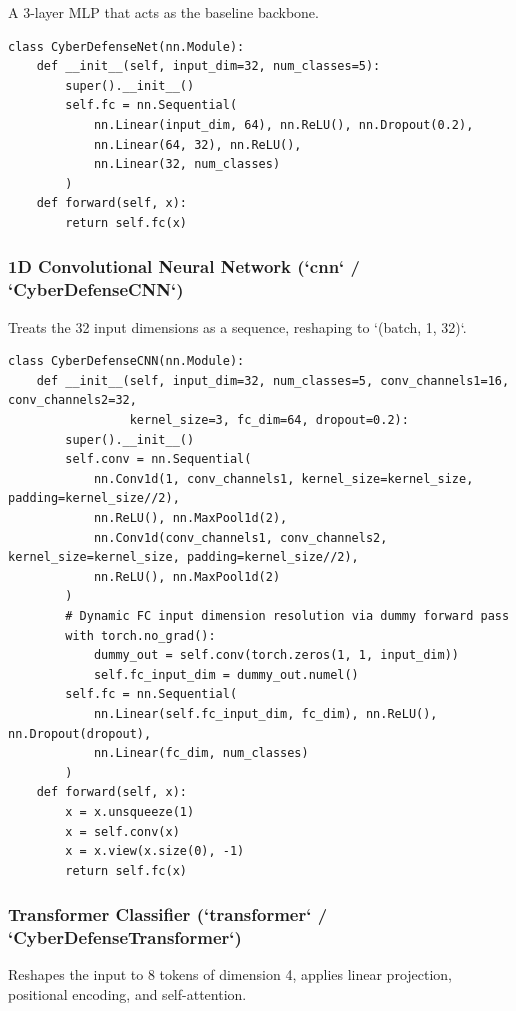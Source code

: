 \documentclass[conference]{IEEEtran}
\begin{document}
A 3-layer MLP that acts as the baseline backbone.

\begin{verbatim}
class CyberDefenseNet(nn.Module):
    def __init__(self, input_dim=32, num_classes=5):
        super().__init__()
        self.fc = nn.Sequential(
            nn.Linear(input_dim, 64), nn.ReLU(), nn.Dropout(0.2),
            nn.Linear(64, 32), nn.ReLU(),
            nn.Linear(32, num_classes)
        )
    def forward(self, x):
        return self.fc(x)
\end{verbatim}


\subsubsection{1D Convolutional Neural Network (`cnn` / `CyberDefenseCNN`)}

Treats the 32 input dimensions as a sequence, reshaping to `(batch, 1, 32)`.

\begin{verbatim}
class CyberDefenseCNN(nn.Module):
    def __init__(self, input_dim=32, num_classes=5, conv_channels1=16, conv_channels2=32,
                 kernel_size=3, fc_dim=64, dropout=0.2):
        super().__init__()
        self.conv = nn.Sequential(
            nn.Conv1d(1, conv_channels1, kernel_size=kernel_size, padding=kernel_size//2),
            nn.ReLU(), nn.MaxPool1d(2),
            nn.Conv1d(conv_channels1, conv_channels2, kernel_size=kernel_size, padding=kernel_size//2),
            nn.ReLU(), nn.MaxPool1d(2)
        )
        # Dynamic FC input dimension resolution via dummy forward pass
        with torch.no_grad():
            dummy_out = self.conv(torch.zeros(1, 1, input_dim))
            self.fc_input_dim = dummy_out.numel()
        self.fc = nn.Sequential(
            nn.Linear(self.fc_input_dim, fc_dim), nn.ReLU(), nn.Dropout(dropout),
            nn.Linear(fc_dim, num_classes)
        )
    def forward(self, x):
        x = x.unsqueeze(1)
        x = self.conv(x)
        x = x.view(x.size(0), -1)
        return self.fc(x)
\end{verbatim}


\subsubsection{Transformer Classifier (`transformer` / `CyberDefenseTransformer`)}

Reshapes the input to 8 tokens of dimension 4, applies linear projection, positional encoding, and self-attention.
\end{document}
